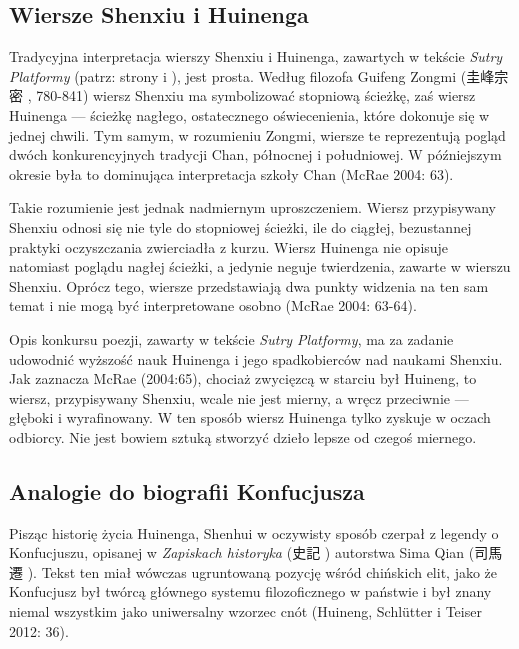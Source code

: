 \subsection{Wiersze Shenxiu i Huinenga}
Tradycyjna interpretacja wierszy Shenxiu i Huinenga, zawartych w tekście \textit{Sutry Platformy} (patrz: strony \pageref{ShenxiuVerse} i \pageref{HuinengVerse}), jest prosta.
Według filozofa Guifeng Zongmi (圭峰宗密 , 780-841) wiersz Shenxiu ma symbolizować stopniową ścieżkę, zaś wiersz Huinenga --- ścieżkę nagłego, ostatecznego oświecenienia, które dokonuje się w jednej chwili.
Tym samym, w rozumieniu Zongmi, wiersze te reprezentują pogląd dwóch konkurencyjnych tradycji Chan, północnej i południowej.
W późniejszym okresie była to dominująca interpretacja szkoły Chan
(McRae 2004: 63).

Takie rozumienie jest jednak nadmiernym uproszczeniem. Wiersz przypisywany Shenxiu odnosi się nie tyle do stopniowej ścieżki, ile do ciągłej, bezustannej praktyki oczyszczania zwierciadła z kurzu.
Wiersz Huinenga nie opisuje natomiast poglądu nagłej ścieżki, a jedynie neguje twierdzenia, zawarte w wierszu Shenxiu.
Oprócz tego, wiersze przedstawiają dwa punkty widzenia na ten sam temat i nie mogą być interpretowane osobno
(McRae 2004: 63-64).

Opis konkursu poezji, zawarty w tekście \textit{Sutry Platformy}, ma za zadanie udowodnić wyższość nauk Huinenga i jego spadkobierców nad naukami Shenxiu.
Jak zaznacza McRae (2004:65), chociaż zwycięzcą w starciu był Huineng, to wiersz, przypisywany Shenxiu, wcale nie jest mierny, a wręcz przeciwnie --- głęboki i wyrafinowany.
W ten sposób wiersz Huinenga tylko zyskuje w oczach odbiorcy. Nie jest bowiem sztuką stworzyć dzieło lepsze od czegoś miernego.

\subsection{Analogie do biografii Konfucjusza}
Pisząc historię życia Huinenga, Shenhui w oczywisty sposób czerpał z legendy o Konfucjuszu, opisanej w \textit{Zapiskach historyka} (史記 ) autorstwa Sima Qian (司馬遷 ).
Tekst ten miał wówczas ugruntowaną pozycję wśród chińskich elit, jako że Konfucjusz był twórcą głównego systemu filozoficznego w państwie i był znany niemal wszystkim jako uniwersalny wzorzec cnót
(Huineng, Schlütter i Teiser 2012: 36).

